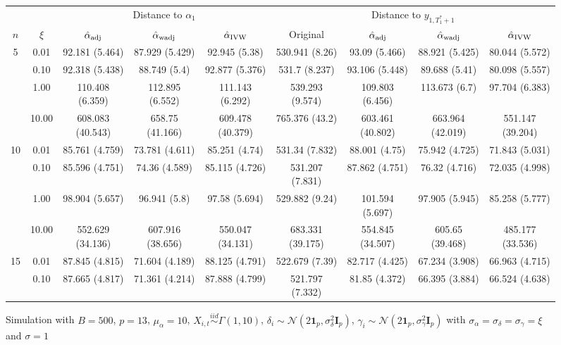 \documentclass[11pt]{article}
\newcommand{\simiid}{\stackrel{iid}{\sim}} %
\def\normal#1#2{\mathcal{N}(#1,#2)} %
\theoremstyle{definition}
\begin{document}
\begin{sidewaysfigure}
\centering
\caption{Simulation  with $B = 500$, $p = 13$, $\mu_{\alpha}=10$, $X_{i,t} \simiid \Gamma(1,10)$, $\delta_i \sim \normal{2\mathbf{1}_p}{\sigma^2_{\delta}\mathbf{I}_p}$, $\gamma_i \sim \normal{2\mathbf{1}_p}{\sigma^2_{\gamma}\mathbf{I}_p}$ with $\sigma_{\alpha} = \sigma_{\delta}=\sigma_{\gamma}=\xi$ and $\sigma = 1$}
\begin{tabular}{cc|ccc|cccc}
  & & \multicolumn{3}{c|}{Distance to $\alpha_1$}  & \multicolumn{4}{c}{Distance to $y_{1, T_1^*+1}$}  \\ 
  $n$   & $\xi$ & $\hat{\alpha}_{\rm adj}$  & $\hat{\alpha}_{\rm wadj}$ & $\hat{\alpha}_{\rm IVW}$ & Original & $\hat{\alpha}_{\rm adj}$ & $\hat{\alpha}_{\rm wadj}$ & $\hat{\alpha}_{\rm IVW}$\\[.3cm]  
  \hline
 \multirow{4}{*}{5}  & 0.01 & 92.181 (5.464) & 87.929 (5.429) & 92.945 (5.38) & 530.941 (8.26) & 93.09 (5.466) & 88.921 (5.425) & 80.044 (5.572) \\ 
    & 0.10 & 92.318 (5.438) & 88.749 (5.4) & 92.877 (5.376) & 531.7 (8.237) & 93.106 (5.448) & 89.688 (5.41) & 80.098 (5.557) \\ 
   & 1.00 & 110.408 (6.359) & 112.895 (6.552) & 111.143 (6.292) & 539.293 (9.574) & 109.803 (6.456) & 113.673 (6.7) & 97.704 (6.383) \\ 
    & 10.00 & 608.083 (40.543) & 658.75 (41.166) & 609.478 (40.379) & 765.376 (43.2) & 603.461 (40.802) & 663.964 (42.019) & 551.147 (39.204)  \\[.3cm]  
   \multirow{4}{*}{10}  & 0.01 & 85.761 (4.759) & 73.781 (4.611) & 85.251 (4.74) & 531.34 (7.832) & 88.001 (4.75) & 75.942 (4.725) & 71.843 (5.031) \\ 
    & 0.10 & 85.596 (4.751) & 74.36 (4.589) & 85.115 (4.726) & 531.207 (7.831) & 87.862 (4.751) & 76.32 (4.716) & 72.035 (4.998) \\ 
   & 1.00 & 98.904 (5.657) & 96.941 (5.8) & 97.58 (5.694) & 529.882 (9.24) & 101.594 (5.697) & 97.905 (5.945) & 85.258 (5.777) \\ 
   & 10.00 & 552.629 (34.136) & 607.916 (38.656) & 550.047 (34.131) & 683.331 (39.175) & 554.845 (34.507) & 605.65 (39.468) & 485.177 (33.536)  \\[.3cm]  
\multirow{4}{*}{15} & 0.01 & 87.845 (4.815) & 71.604 (4.189) & 88.125 (4.791) & 522.679 (7.39) & 82.717 (4.425) & 67.234 (3.908) & 66.963 (4.715) \\ 
   & 0.10 & 87.665 (4.817) & 71.361 (4.214) & 87.888 (4.799) & 521.797 (7.332) & 81.85 (4.372) & 66.395 (3.884) & 66.524 (4.638) \\ 

\end{tabular}
\end{sidewaysfigure}
\end{document}
